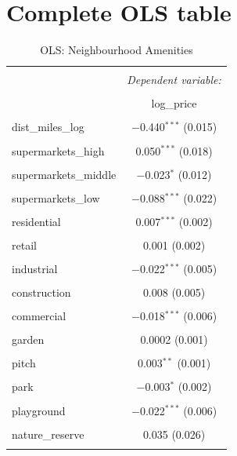 \documentclass{article}
\begin{document}
\section{Complete OLS table}
\begin{table}[H] \centering 
  \caption{OLS: Neighbourhood Amenities} 
  \label{table:complete} 
\small 
\begin{tabular}{@{\extracolsep{-10pt}}lc} 
\\[-1.8ex]\hline 
\hline \\[-1.8ex] 
 & \multicolumn{1}{c}{\textit{Dependent variable:}} \\ 
\cline{2-2} 
\\[-1.8ex] & log\_price \\ 
\hline \\[-1.8ex] 
 dist\_miles\_log & $-$0.440$^{***}$ (0.015) \\ 
  & \\ 
 supermarkets\_high & 0.050$^{***}$ (0.018) \\ 
  & \\ 
 supermarkets\_middle & $-$0.023$^{*}$ (0.012) \\ 
  & \\ 
 supermarkets\_low & $-$0.088$^{***}$ (0.022) \\ 
  & \\ 
 residential & 0.007$^{***}$ (0.002) \\ 
  & \\ 
 retail & 0.001 (0.002) \\ 
  & \\ 
 industrial & $-$0.022$^{***}$ (0.005) \\ 
  & \\ 
 construction & 0.008 (0.005) \\ 
  & \\ 
 commercial & $-$0.018$^{***}$ (0.006) \\ 
  & \\ 
 garden & 0.0002 (0.001) \\ 
  & \\ 
 pitch & 0.003$^{**}$ (0.001) \\ 
  & \\ 
 park & $-$0.003$^{*}$ (0.002) \\ 
  & \\ 
 playground & $-$0.022$^{***}$ (0.006) \\ 
  & \\ 
 nature\_reserve & 0.035 (0.026) \\ 
  & \\ 

\end{tabular}
\end{table}
\end{document}
